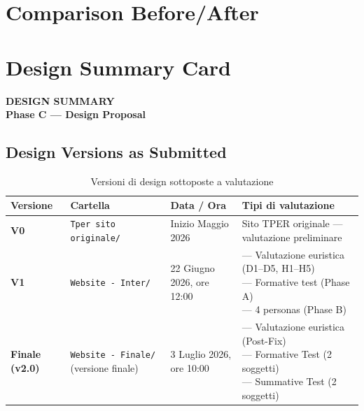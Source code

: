 ﻿\documentclass[11pt,a4paper]{article}
\begin{document}

\newpage
\section{Comparison Before/After}
\label{sec:comparison}




\newpage

\section{Design Summary Card}
\label{sec:design-summary}

\begin{tcolorbox}[headerbox]
 \color{white}\LARGE\bfseries\sffamily DESIGN SUMMARY \\[0.1cm]
 \color{white!80}\small\sffamily Phase C --- Design Proposal
\end{tcolorbox}

\vspace{0.3cm}

\subsection*{Design Versions as Submitted}

\begin{table}[H]
\centering
\small
\renewcommand{\arraystretch}{1.3}
\begin{tabular}{|p{2.2cm}|p{3.2cm}|p{2.8cm}|p{4.2cm}|}
\hline
\textbf{Versione} & \textbf{Cartella} & \textbf{Data / Ora} & \textbf{Tipi di valutazione} \\
\hline
\textbf{V0} 
& \texttt{Tper sito originale/}
& Inizio Maggio 2026
& Sito TPER originale --- valutazione preliminare \\
\hline
\textbf{V1} 
& \texttt{Website - Inter/}
& 22 Giugno 2026, ore 12:00
& \parbox{4.5cm}{\raggedright --- Valutazione euristica (D1--D5, H1--H5) \\ --- Formative test (Phase A) \\ --- 4 personas (Phase B)} \\
\hline
\textbf{Finale (v2.0)} 
& \texttt{Website - Finale/} (versione finale)
& 3 Luglio 2026, ore 10:00
& \parbox{3.8cm}{\raggedright --- Valutazione euristica (Post-Fix) \\ --- Formative Test (2 soggetti) \\ --- Summative Test (2 soggetti)} \\
\hline
\end{tabular}
\caption{Versioni di design sottoposte a valutazione}
\label{tab:design-versions}
\end{table}
\end{document}
